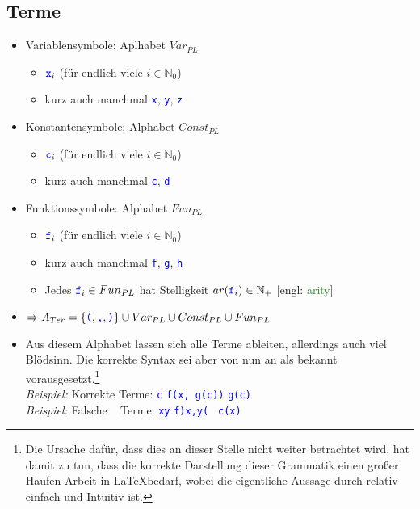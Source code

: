 \documentclass{article}
\newcommand{\N}{\mathbb{N_+}} %
\newcommand{\Nz}{{\mathbb{N}_0}} %
\newcommand{\blue}[1]{\textcolor{blue}{#1}}
\newcommand{\important}[1]{\textcolor{importantColor}{#1}}
\newcommand{\verweis}[1]{\textcolor{ForestGreen}{#1}}
\newcommand{\example}[1]{\textit{Beispiel: }#1}
\newcommand{\word}[1]{\blue{\texttt{#1}}}
\newcommand{\set}[1]{\{#1\}}
\begin{document}
\subsection{Terme}
\begin{itemize}
    \item \important{Variablensymbole}: Aplhabet $Var_{PL}$
    \begin{itemize}
        \item $\word{x}_i$ (für endlich viele $i\in \Nz$)
        \item kurz auch manchmal \word{x}, \word{y}, \word{z}
    \end{itemize}
    \item \important{Konstantensymbole}: Alphabet $Const_{PL}$
    \begin{itemize}
        \item $\word{c}_i$ (für endlich viele $i\in \Nz$)
        \item kurz auch manchmal \word{c}, \word{d}
    \end{itemize}
    \item \important{Funktionssymbole}: Alphabet $Fun_{PL}$
    \begin{itemize}
        \item $\word{f}_i$ (für endlich viele $i\in \Nz$)
        \item kurz auch manchmal \word{f}, \word{g}, \word{h}
        \item Jedes $\word{f}_i \in Fun_{PL}$ hat \important{Stelligkeit} $ar(\word{f}_i) \in \N$ [engl: \verweis{arity}]
    \end{itemize}
    \item $\Rightarrow A_{Ter}=\set{\word{(}, \word{,}, \word{)}} \cup Var_{PL}\cup Const_{PL}\cup Fun_{PL}$
    \item Aus diesem Alphabet lassen sich alle Terme ableiten, allerdings auch viel Blödsinn. Die korrekte Syntax sei aber von nun an als bekannt vorausgesetzt.\footnote{Die Ursache dafür, dass dies an dieser Stelle nicht weiter betrachtet wird, hat damit zu tun, dass die korrekte Darstellung dieser Grammatik einen großer Haufen Arbeit in \LaTeX  bedarf, wobei die eigentliche Aussage durch relativ einfach und Intuitiv ist.}\\
    \example Korrekte Terme: \quad \word{c\hphantom{y}} \qquad \word{f(x, g(c))} \qquad \word{g(c)}\\
    \example Falsche$\;\;\;$ Terme: \quad \word{xy} \qquad \word{f)x,y( \hphantom{c()}} \qquad \word{c(x)}
\end{itemize}
\end{document}
